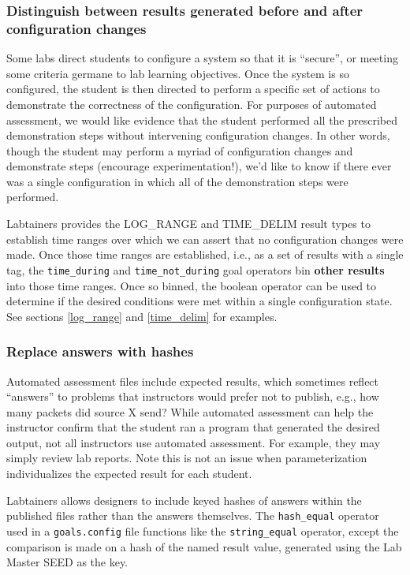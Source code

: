 \documentclass[12pt]{article}
\begin{document}
\subsubsection{Distinguish between results generated before and after configuration changes}
\label{config-ranges}
Some labs direct students to configure a system so that it is ``secure'', or meeting some criteria
germane to lab learning objectives.  Once the system is so configured, the student is then
directed to perform a specific set of actions to demonstrate the correctness of the
configuration.  For purposes of automated assessment, we would like evidence that
the student performed all the prescribed demonstration steps without intervening
configuration changes.  In other words, though the student may perform a myriad of
configuration changes and demonstrate steps (encourage experimentation!), 
we'd like to know if there ever was a
single configuration in which all of the demonstration steps were performed.

Labtainers provides the {LOG\_RANGE} and {TIME\_DELIM} result types to establish time
ranges over which we can assert that no configuration changes were made.  Once those time ranges
are established, i.e., as a set of results with a single tag, the {\tt time\_during} and
{\tt time\_not\_during} goal operators bin \textbf{other results} into
those time ranges.  Once so binned, the boolean operator can be used to determine if
the desired conditions were met within a single configuration state.  See sections
\ref{log_range} and \ref{time_delim} for examples.


\subsubsection{Replace answers with hashes}
\label{hash-goals}
Automated assessment files include expected results, which sometimes reflect ``answers'' to problems
that instructors would prefer not to publish, e.g., how many packets did source X send?
While automated assessment can help the instructor confirm that the student ran a program that generated the
desired output, not all instructors use automated assessment.  For example, they may simply review lab reports.
Note this is not an issue when parameterization individualizes the expected result for each student.

Labtainers allows designers to include keyed hashes of answers within the published files rather
than the answers themselves.  The {\tt hash\_equal} operator used in a {\tt goals.config} file functions like
the {\tt string\_equal} operator, except the comparison is made on a hash of the named result value, generated
using the Lab Master SEED as the key.  
\end{document}

